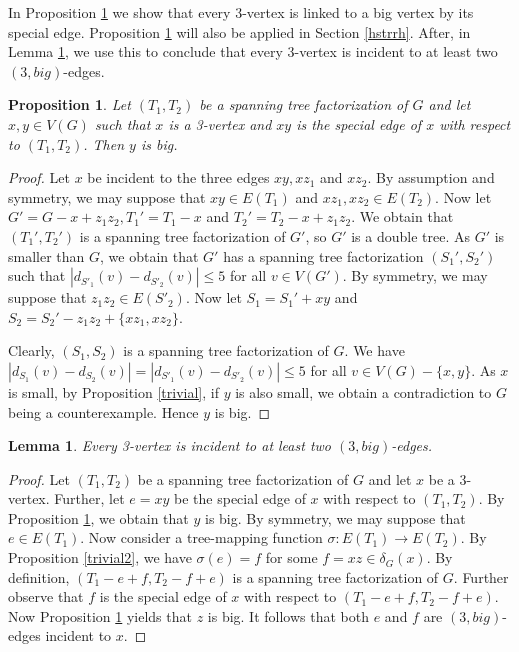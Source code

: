\documentclass{article}
\theoremstyle{plain}
\newtheorem{Lemma}{Lemma}
\newtheorem{Proposition}{Proposition}
\theoremstyle{nonumberplain}
\theoremstyle{nonumberplain}
\newcommand{\stf}{spanning tree factorization }
\begin{document}
In Proposition \ref{cfzz} we show that every 3-vertex is linked to a big vertex by its special edge. Proposition \ref{cfzz} will also be applied in Section \ref{hstrrh}. After, in Lemma \ref{aumoins23}, we use this to conclude that every 3-vertex is incident to at least two $(3,big)$-edges. 
\begin{Proposition}\label{cfzz}
Let $(T_1,T_2)$ be a \stf of $G$ and let $x,y \in V(G)$ such that $x$ is a 3-vertex and $xy$ is the special edge of $x$ with respect to $(T_1,T_2)$. Then $y$ is big.
\end{Proposition}
\begin{proof}
Let $x$ be incident to the three edges $xy,xz_1$ and $xz_2$. By assumption and symmetry, we may suppose that $xy \in E(T_1)$ and $xz_1,xz_2 \in E(T_2)$. Now let $G'=G-x+z_1z_2, T_1'=T_1-x$ and $T_2'=T_2-x+z_1z_2$.  We obtain that $(T_1',T_2')$ is a \stf of $G'$, so $G'$ is a double tree. As $G'$ is smaller than $G$, we obtain that $G'$ has a \stf $(S_1',S_2')$ such that $|d_{S'_1}(v)-d_{S'_2}(v)|\leq 5$ for all $v \in V(G')$. By symmetry, we may suppose that $z_1z_2 \in E(S'_2)$. Now let $S_1=S_1'+xy$ and $S_2=S_2'-z_1z_2+\{xz_1,xz_2\}$.

 Clearly, $(S_1,S_2)$ is a \stf of $G$. We have $|d_{S_1}(v)-d_{S_2}(v)|=|d_{S'_1}(v)-d_{S'_2}(v)|\leq 5$ for all $v \in V(G)-\{x,y\}$. As $x$ is small, by Proposition \ref{trivial}, if $y$ is also small, we obtain a contradiction to $G$ being a counterexample. Hence $y$ is big.
\end{proof}
\begin{Lemma}\label{aumoins23}
Every 3-vertex is incident to at least two $(3,big)$-edges.
\end{Lemma}
\begin{proof}
Let $(T_1,T_2)$ be a \stf of $G$ and let $x$ be a 3-vertex. Further, let $e=xy$ be the special edge of $x$ with respect to $(T_1,T_2)$. By Proposition \ref{cfzz}, we obtain that $y$ is big. By symmetry, we may suppose that $e \in E(T_1)$.  Now consider a tree-mapping function $\sigma:E(T_1)\rightarrow E(T_2)$. By Proposition \ref{trivial2}, we have $\sigma(e)=f$ for some $f=xz \in \delta_G(x)$. By definition, $(T_1-e+f,T_2-f+e)$ is a \stf of $G$. Further observe that $f$ is the special edge of $x$ with respect to $(T_1-e+f,T_2-f+e)$. Now Proposition \ref{cfzz} yields that $z$ is big. It follows that both $e$ and $f$ are $(3,big)$-edges incident to $x$.
\end{proof}
\end{document}
